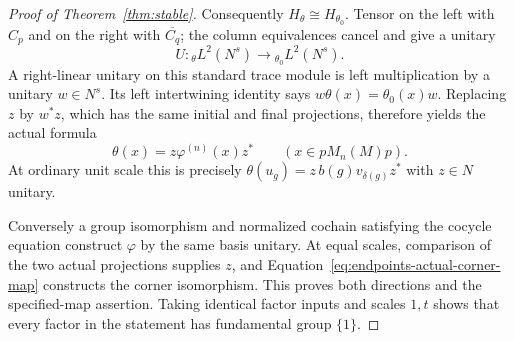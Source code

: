 \begin{proof}[Proof of Theorem~\ref{thm:stable}]
Consequently \(H_\theta\cong H_{\theta_0}\).  Tensor on the left
with \(C_p\) and on the right with \(\overline{C_q}\); the column
equivalences cancel and give a unitary
\[
 U:{}_\theta L^2(N^s)\longrightarrow {}_{\theta_0}L^2(N^s).
\]
A right-linear unitary on this standard trace module is left
multiplication by a unitary \(w\in N^s\).
Its left intertwining identity says
\(w\theta(x)=\theta_0(x)w\).
Replacing \(z\) by \(w^*z\), which has the same initial and final
projections, therefore yields the actual formula
\begin{equation}
 \theta(x)=z\varphi^{(n)}(x)z^*
 \qquad(x\in pM_n(M)p).
 \label{eq:endpoints-actual-corner-map}
\end{equation}
At ordinary unit scale this is precisely
\(\theta(u_g)=z\,b(g)v_{\delta(g)}z^*\) with \(z\in N\) unitary.

Conversely a group isomorphism and normalized cochain satisfying the
cocycle equation construct \(\varphi\) by the same basis unitary.
At equal scales, comparison of the two actual projections supplies
\(z\), and Equation~\eqref{eq:endpoints-actual-corner-map} constructs
the corner isomorphism.  This proves both directions and the
specified-map assertion.  Taking identical factor inputs and scales
\(1,t\) shows that every factor in the statement has fundamental
group \(\{1\}\).
\end{proof}

